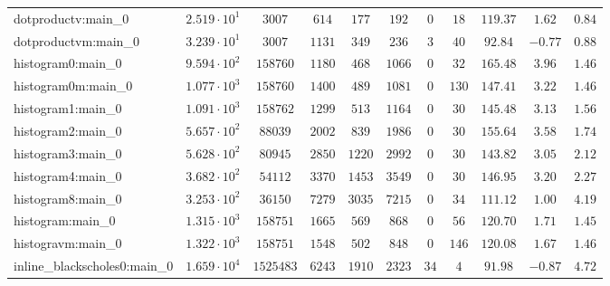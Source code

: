 \begin{tabular}{|l|c|c|c|c|c|c|c|c|c|c|}
dotproductv:main\_0            & $ 2.519 \cdot 10^{1} $ & $ 3007     $ & $ 614    $ & $ 177    $ & $ 192    $ & $ 0    $ & $ 18   $ & $ 119.37      $ & $ 1.62    $ & $ 0.84    $ \\
dotproductvm:main\_0           & $ 3.239 \cdot 10^{1} $ & $ 3007     $ & $ 1131   $ & $ 349    $ & $ 236    $ & $ 3    $ & $ 40   $ & $ 92.84       $ & $ -0.77   $ & $ 0.88    $ \\
histogram0:main\_0             & $ 9.594 \cdot 10^{2} $ & $ 158760   $ & $ 1180   $ & $ 468    $ & $ 1066   $ & $ 0    $ & $ 32   $ & $ 165.48      $ & $ 3.96    $ & $ 1.46    $ \\
histogram0m:main\_0            & $ 1.077 \cdot 10^{3} $ & $ 158760   $ & $ 1400   $ & $ 489    $ & $ 1081   $ & $ 0    $ & $ 130  $ & $ 147.41      $ & $ 3.22    $ & $ 1.46    $ \\
histogram1:main\_0             & $ 1.091 \cdot 10^{3} $ & $ 158762   $ & $ 1299   $ & $ 513    $ & $ 1164   $ & $ 0    $ & $ 30   $ & $ 145.48      $ & $ 3.13    $ & $ 1.56    $ \\
histogram2:main\_0             & $ 5.657 \cdot 10^{2} $ & $ 88039    $ & $ 2002   $ & $ 839    $ & $ 1986   $ & $ 0    $ & $ 30   $ & $ 155.64      $ & $ 3.58    $ & $ 1.74    $ \\
histogram3:main\_0             & $ 5.628 \cdot 10^{2} $ & $ 80945    $ & $ 2850   $ & $ 1220   $ & $ 2992   $ & $ 0    $ & $ 30   $ & $ 143.82      $ & $ 3.05    $ & $ 2.12    $ \\
histogram4:main\_0             & $ 3.682 \cdot 10^{2} $ & $ 54112    $ & $ 3370   $ & $ 1453   $ & $ 3549   $ & $ 0    $ & $ 30   $ & $ 146.95      $ & $ 3.20    $ & $ 2.27    $ \\
histogram8:main\_0             & $ 3.253 \cdot 10^{2} $ & $ 36150    $ & $ 7279   $ & $ 3035   $ & $ 7215   $ & $ 0    $ & $ 34   $ & $ 111.12      $ & $ 1.00    $ & $ 4.19    $ \\
histogram:main\_0              & $ 1.315 \cdot 10^{3} $ & $ 158751   $ & $ 1665   $ & $ 569    $ & $ 868    $ & $ 0    $ & $ 56   $ & $ 120.70      $ & $ 1.71    $ & $ 1.45    $ \\
histogravm:main\_0             & $ 1.322 \cdot 10^{3} $ & $ 158751   $ & $ 1548   $ & $ 502    $ & $ 848    $ & $ 0    $ & $ 146  $ & $ 120.08      $ & $ 1.67    $ & $ 1.46    $ \\
inline\_blackscholes0:main\_0  & $ 1.659 \cdot 10^{4} $ & $ 1525483  $ & $ 6243   $ & $ 1910   $ & $ 2323   $ & $ 34   $ & $ 4    $ & $ 91.98       $ & $ -0.87   $ & $ 4.72    $ \\

\end{tabular}
